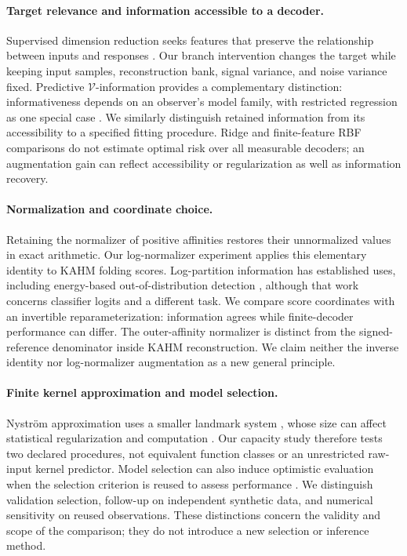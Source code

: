 \paragraph{Target relevance and information accessible to a decoder.}
Supervised dimension reduction seeks features that preserve the relationship
between inputs and responses \citep{Fukumizu2004SDR}. Our branch intervention
changes the target while keeping input samples, reconstruction bank, signal
variance, and noise variance fixed. Predictive $\mathcal{V}$-information
provides a complementary distinction: informativeness depends on an
observer's model family, with restricted regression as one special case
\citep{Xu2020Usable}. We similarly distinguish retained information from its
accessibility to a specified fitting procedure. Ridge and finite-feature
RBF comparisons do not estimate optimal risk over all measurable decoders;
an augmentation gain can reflect accessibility or regularization as well
as information recovery.

\paragraph{Normalization and coordinate choice.}
Retaining the normalizer of positive affinities restores their unnormalized
values in exact arithmetic. Our log-normalizer experiment applies this
elementary identity to KAHM folding scores. Log-partition information has
established uses, including energy-based out-of-distribution detection
\citep{Liu2020Energy}, although that work concerns classifier logits and
a different task. We compare score coordinates with an invertible
reparameterization: information agrees while finite-decoder performance can
differ. The outer-affinity normalizer is distinct from the signed-reference
denominator inside KAHM reconstruction. We claim neither the inverse identity
nor log-normalizer augmentation as a new general principle.

\paragraph{Finite kernel approximation and model selection.}
Nystr\"om approximation uses a smaller landmark system
\citep{Williams2001Nystrom}, whose size can affect statistical regularization
and computation \citep{Rudi2015Nystrom}. Our capacity study therefore tests
two declared procedures, not equivalent function classes or an unrestricted
raw-input kernel predictor. Model selection can also induce optimistic
evaluation when the selection criterion is reused to assess performance
\citep{Cawley2010Selection}. We distinguish validation selection, follow-up
on independent synthetic data, and numerical sensitivity on reused
observations. These distinctions concern the validity and scope of the
comparison; they do not introduce a new selection or inference method.

